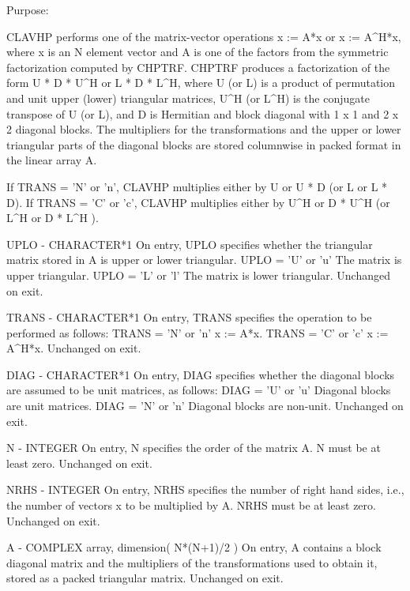 \begin{DoxyParagraph}{Purpose\+: }
\begin{DoxyVerb}    CLAVHP  performs one of the matrix-vector operations
       x := A*x  or  x := A^H*x,
    where x is an N element vector and  A is one of the factors
    from the symmetric factorization computed by CHPTRF.
    CHPTRF produces a factorization of the form
         U * D * U^H     or     L * D * L^H,
    where U (or L) is a product of permutation and unit upper (lower)
    triangular matrices, U^H (or L^H) is the conjugate transpose of
    U (or L), and D is Hermitian and block diagonal with 1 x 1 and
    2 x 2 diagonal blocks.  The multipliers for the transformations
    and the upper or lower triangular parts of the diagonal blocks
    are stored columnwise in packed format in the linear array A.

    If TRANS = 'N' or 'n', CLAVHP multiplies either by U or U * D
    (or L or L * D).
    If TRANS = 'C' or 'c', CLAVHP multiplies either by U^H or D * U^H
    (or L^H or D * L^H ).\end{DoxyVerb}
 \begin{DoxyVerb}  UPLO   - CHARACTER*1
           On entry, UPLO specifies whether the triangular matrix
           stored in A is upper or lower triangular.
              UPLO = 'U' or 'u'   The matrix is upper triangular.
              UPLO = 'L' or 'l'   The matrix is lower triangular.
           Unchanged on exit.

  TRANS  - CHARACTER*1
           On entry, TRANS specifies the operation to be performed as
           follows:
              TRANS = 'N' or 'n'   x := A*x.
              TRANS = 'C' or 'c'   x := A^H*x.
           Unchanged on exit.

  DIAG   - CHARACTER*1
           On entry, DIAG specifies whether the diagonal blocks are
           assumed to be unit matrices, as follows:
              DIAG = 'U' or 'u'   Diagonal blocks are unit matrices.
              DIAG = 'N' or 'n'   Diagonal blocks are non-unit.
           Unchanged on exit.

  N      - INTEGER
           On entry, N specifies the order of the matrix A.
           N must be at least zero.
           Unchanged on exit.

  NRHS   - INTEGER
           On entry, NRHS specifies the number of right hand sides,
           i.e., the number of vectors x to be multiplied by A.
           NRHS must be at least zero.
           Unchanged on exit.

  A      - COMPLEX array, dimension( N*(N+1)/2 )
           On entry, A contains a block diagonal matrix and the
           multipliers of the transformations used to obtain it,
           stored as a packed triangular matrix.
           Unchanged on exit.


\end{DoxyVerb}
\end{DoxyParagraph}
